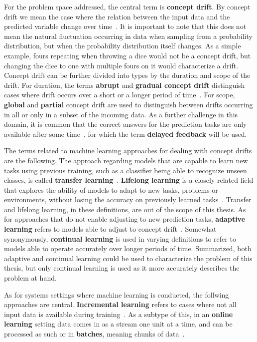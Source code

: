For the problem space addressed, the central term is \textbf{concept drift}. By concept drift we mean the case where the relation between the input
data and the predicted variable change over time~\cite{conceptdriftsurvey}. It is important to note that this does not mean the natural fluctuation occurring in data when sampling from a probability distribution, but when the probability distribution itself changes. As a simple example, fours repeating when throwing a dice would not be a concept drift, but changing the dice to one with multiple fours on it would characterize a drift. Concept drift can be further divided into types by the duration and scope of the drift. For duration, the terms \textbf{abrupt} and \textbf{gradual concept drift} distinguish cases where drift occurs over a short or a longer period of time~\cite{zliobaiteAdaptiveTrainingSet2010}. For scope, \textbf{global} and \textbf{partial} concept drift are used to distinguish between drifts occurring in all or only in a subset of the incoming data. As a further challenge in this domain, it is common that the correct answers for the prediction tasks are only available after some time~\cite{adaptivelearningsystems}, for which the term  \textbf{delayed feedback} will be used. 

The terms related to machine learning approaches for dealing with concept drifts are the following. The approach regarding models that are capable to learn new tasks using previous training, such as a classifier being able to recognize unseen classes, is called \textbf{transfer learning}~\cite{iotsurvey}. \textbf{Lifelong learning} is a closely related field that explores the ability of models to adapt to new tasks, problems or environments, without losing the accuracy on previously learned tasks~\cite{lmlinneuralnets}. Transfer and lifelong learning, in these definitions, are out of the scope of this thesis. As for approaches that do not enable adjusting to new prediction tasks, \textbf{adaptive learning} refers to models able to adjust to concept drift~\cite{conceptdriftsurvey}. Somewhat synonymously, \textbf{continual learning} is used in varying definitions to refer to models able to operate accurately over longer periods of time. Summarized, both adaptive and continual learning could be used to characterize the problem of this thesis, but only continual learning is used as it more accurately describes the problem at hand.

As for systems settings where machine learning is conducted, the follwing approaches are central. \textbf{Incremental learning} refers to cases where not all input data is available during training~\cite{giraud-carrierNoteUtilityIncremental2000}. As a subtype of this, in an \textbf{online learning} setting data comes in as a stream one unit at a time, and can be processed as such or in \textbf{batches}, meaning chunks of data~\cite{conceptdriftsurvey}.

